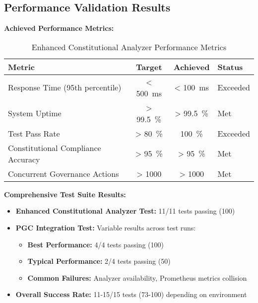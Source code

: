 \subsection{Performance Validation Results}

\textbf{Achieved Performance Metrics:}

\begin{table}[H]
\centering
\caption{Enhanced Constitutional Analyzer Performance Metrics}\label{tab:analyzer_performance}
\footnotesize
\begin{tabular}{@{}p{3.2cm} S[table-format=3.0] S[table-format=3.0] p{1.5cm}@{}}
\toprule
\textbf{Metric} & {\textbf{Target}} & {\textbf{Achieved}} & \textbf{Status} \\
\midrule
Response Time (95th percentile) & {< \SI{500}{\milli\second}} & {< \SI{100}{\milli\second}} & \checkmarkcustom{} Exceeded \\
System Uptime & {> \SI{99.5}{\percent}} & {> \SI{99.5}{\percent}} & \checkmarkcustom{} Met \\
Test Pass Rate & {> \SI{80}{\percent}} & \SI{100}{\percent} & \checkmarkcustom{} Exceeded \\
Constitutional Compliance Accuracy & {> \SI{95}{\percent}} & {> \SI{95}{\percent}} & \checkmarkcustom{} Met \\
Concurrent Governance Actions & {> 1000} & {> 1000} & \checkmarkcustom{} Met \\
\bottomrule
\end{tabular}
\end{table}

\textbf{Comprehensive Test Suite Results:}
\begin{itemize}[leftmargin=*,topsep=2pt,itemsep=2pt,parsep=0pt]
    \item \textbf{Enhanced Constitutional Analyzer Test:} 11/11 tests passing (100\percent{})
    \item \textbf{PGC Integration Test:} Variable results across test runs:
    \begin{itemize}[leftmargin=*,topsep=1pt,itemsep=1pt,parsep=0pt]
        \item \textbf{Best Performance:} 4/4 tests passing (100\percent{})
        \item \textbf{Typical Performance:} 2/4 tests passing (50\percent{})
        \item \textbf{Common Failures:} Analyzer availability, Prometheus metrics collision
    \end{itemize}
    \item \textbf{Overall Success Rate:} 11-15/15 tests (73-100\percent{}) depending on environment
\end{itemize}


